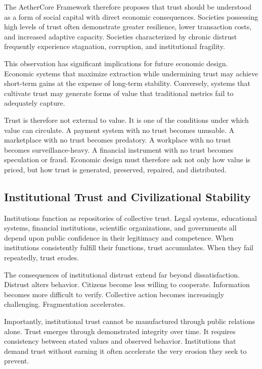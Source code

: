 \documentclass[12pt]{article}
\begin{document}
The AetherCore Framework therefore proposes that trust should be understood as a form of social capital with direct economic consequences. Societies possessing high levels of trust often demonstrate greater resilience, lower transaction costs, and increased adaptive capacity. Societies characterized by chronic distrust frequently experience stagnation, corruption, and institutional fragility.

This observation has significant implications for future economic design. Economic systems that maximize extraction while undermining trust may achieve short-term gains at the expense of long-term stability. Conversely, systems that cultivate trust may generate forms of value that traditional metrics fail to adequately capture.

Trust is therefore not external to value. It is one of the conditions under which value can circulate. A payment system with no trust becomes unusable. A marketplace with no trust becomes predatory. A workplace with no trust becomes surveillance-heavy. A financial instrument with no trust becomes speculation or fraud. Economic design must therefore ask not only how value is priced, but how trust is generated, preserved, repaired, and distributed.

\subsection{Institutional Trust and Civilizational Stability}

Institutions function as repositories of collective trust. Legal systems, educational systems, financial institutions, scientific organizations, and governments all depend upon public confidence in their legitimacy and competence. When institutions consistently fulfill their functions, trust accumulates. When they fail repeatedly, trust erodes.

The consequences of institutional distrust extend far beyond dissatisfaction. Distrust alters behavior. Citizens become less willing to cooperate. Information becomes more difficult to verify. Collective action becomes increasingly challenging. Fragmentation accelerates.

Importantly, institutional trust cannot be manufactured through public relations alone. Trust emerges through demonstrated integrity over time. It requires consistency between stated values and observed behavior. Institutions that demand trust without earning it often accelerate the very erosion they seek to prevent.
\end{document}
